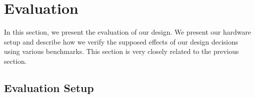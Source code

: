\documentclass[12pt,a4paper]{book}
\begin{document}
%


%
\blindtext

\chapter{Evaluation}\label{ch:eval}
In this section, we present the evaluation of our design.
We present our hardware setup and describe how we verify the supposed effects of our design decisions using various benchmarks.
This section is very closely related to the previous section.
\section{Evaluation Setup}
\end{document}
